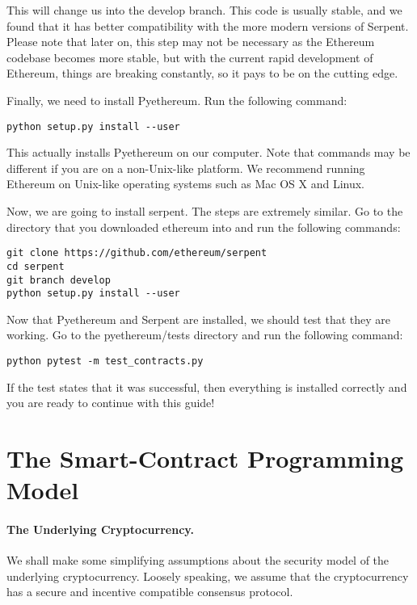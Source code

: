\documentclass[12pt]{article}
\begin{document}
This will change us into the develop branch. This code is usually stable, and we found that it has better compatibility with the more modern versions of Serpent. Please note that later on, this step may not be necessary as the Ethereum codebase becomes more stable, but with the current rapid development of Ethereum, things are breaking constantly, so it pays to be on the cutting edge.

Finally, we need to install Pyethereum. Run the following command:

\begin{verbatim}
python setup.py install --user
\end{verbatim}

This actually installs Pyethereum on our computer. Note that commands may be different if you are on a non-Unix-like platform. We recommend running Ethereum on Unix-like operating systems such as Mac OS X and Linux.

Now, we are going to install serpent. The steps are extremely similar. Go to the directory that you downloaded ethereum into and run the following commands:

\begin{verbatim}
git clone https://github.com/ethereum/serpent
cd serpent
git branch develop
python setup.py install --user
\end{verbatim}

Now that Pyethereum and Serpent are installed, we should test that they are working. Go to the pyethereum/tests directory and run the following command:

\begin{verbatim}
python pytest -m test_contracts.py
\end{verbatim}

If the test states that it was successful, then everything is installed correctly and you are ready to continue with this guide!

\section{The Smart-Contract Programming Model}

\paragraph{The Underlying Cryptocurrency.}
We shall make some simplifying assumptions 
about the security model of the underlying cryptocurrency.
Loosely speaking, we assume that the
cryptocurrency has a secure and incentive compatible
consensus protocol.
\end{document}
